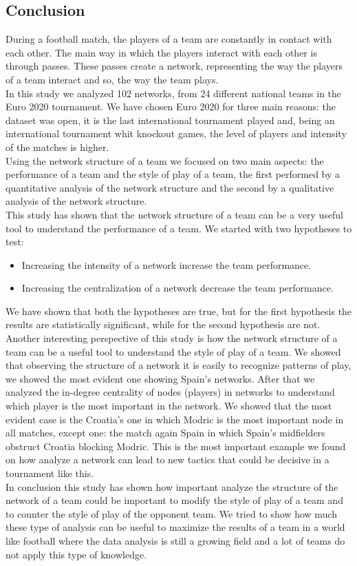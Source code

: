 \documentclass[12pt, a4paper]{article}
\begin{document}
\subsection{Conclusion}
\label{conclusion}
During a football match, the players of a team are constantly in contact with each other. The main way in which the players interact with each other is through passes. These passes create a network, representing the way the players of a team interact and so, the way the team plays.\\
In this study we analyzed 102 networks, from 24 different national teams in the Euro 2020 tournament. We have chosen Euro 2020 for three main reasons: the dataset was open, it is the last international tournament played and, being an international tournament whit knockout games, the level of players and intensity of the matches is higher.\\
Using the network structure of a team we focused on two main aspects: the performance of a team and the style of play of a team, the first performed by a quantitative analysis of the network structure and the second by a qualitative analysis of the network structure.\\
This study has shown that the network structure of a team can be a very useful tool to understand the performance of a team. We started with two hypotheses to test:
\begin{itemize}
        \item Increasing the intensity of a network increase the team performance.
        \item Increasing the centralization of a network decrease the team performance. 
\end{itemize}
We have shown that both the hypotheses are true, but for the first hypothesis the results are statistically significant, while for the second hypothesis are not.\\
Another interesting perspective of this study is how the network structure of a team can be a useful tool to understand the style of play of a team. We showed that observing the structure of a network it is easily to recognize patterns of play, we showed the most evident one showing Spain's networks. After that we analyzed the in-degree centrality of nodes (players) in networks 
to understand which player is the most important in the network. We showed that the most evident case is the Croatia's one in which Modric is the most important node in all matches, except one: the match again Spain in which Spain's midfielders obstruct Croatia blocking Modric. This is the most important example we found on how analyze a network can lead to new tactics that could be decisive in a tournament like this. \\
In conclusion this study has shown how important analyze the structure of the network of a team could be important to modify the style of play of a team and to counter the style of play of the opponent team. We tried to show how much these type of analysis can be useful to maximize the results of a team in a world like football where the data analysis is still a growing field and a lot of teams do not apply this type of knowledge.\\
\end{document}
